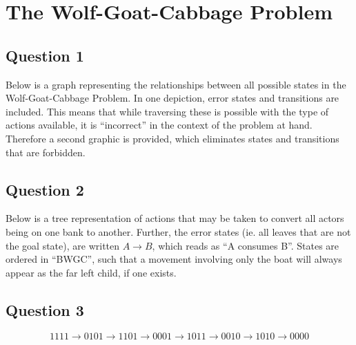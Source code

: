 \section{The Wolf-Goat-Cabbage Problem}

  \subsection{Question 1}

    Below is a graph representing the relationships between all possible states
    in the Wolf-Goat-Cabbage Problem. In one depiction, error states and transitions are
    included. This means that while traversing these is possible with the type of actions
    available, it is ``incorrect'' in the context of the problem at hand. Therefore a second
    graphic is provided, which eliminates states and transitions that are forbidden.

    \bigskip
    \bigskip
    

  \subsection{Question 2}

  Below is a tree representation of actions that may be taken to convert all
  actors being on one bank to another. Further, the error states (ie. all leaves that
  are not the goal state), are written $A \rightarrow B$, which reads as ``A
  consumes B''. States are ordered in ``BWGC'', such that a movement involving
  only the boat will always appear as the far left child, if one exists.

    \bigskip

    

  \subsection{Question 3}

    \bigskip

    $$1111 \rightarrow 0101 \rightarrow 1101 \rightarrow 0001 \rightarrow 1011
    \rightarrow 0010 \rightarrow 1010 \rightarrow 0000$$
